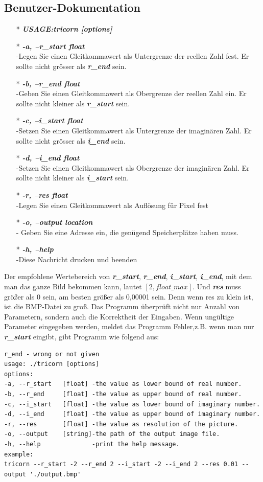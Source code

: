 \documentclass[course=erap]{aspdoc}
\begin{document}
\subsection{Benutzer-Dokumentation}
\begin{itemize}
\item[*]\textbf{\emph{USAGE:tricorn [options]}}
\item[*]\textbf{\emph{-a, --r\_start  float}}
\\-Legen Sie einen Gleitkommawert als Untergrenze der reellen Zahl fest. Er sollte nicht grösser als \emph{\textbf{r\_end}} sein.
\item[*]\textbf{\emph{-b, --r\_end float}}
\\-Geben Sie einen Gleitkommawert als Obergrenze der reellen Zahl ein. Er sollte nicht kleiner als \emph{\textbf{r\_start}} sein.
\item[*]\textbf{\emph{-c, --i\_start  float}}
\\-Setzen Sie einen Gleitkommawert als Untergrenze der imaginären Zahl. Er sollte nicht grösser als \emph{\textbf{i\_end}} sein.
\item[*]\textbf{\emph{-d, --i\_end  float}}
\\-Setzen Sie einen Gleitkommawert als Obergrenze der imaginären Zahl. Er sollte nicht kleiner als \emph{\textbf{i\_start}} sein.
\item[*]\textbf{\emph{-r, --res  float}}
\\-Legen Sie einen Gleitkommawert als Auflösung für Pixel fest
\item[*]\textbf{\emph{-o, --output  location}}
\\- Geben Sie eine Adresse ein, die genügend Speicherplätze haben muss.
\item[*]\textbf{\emph{-h, --help}}
\\-Diese Nachricht drucken und beenden
\end{itemize}
Der empfohlene Wertebereich von \textbf{\emph{r\_start}}, \textbf{\emph{r\_end}}, \textbf{\emph{i\_start}}, \textbf{\emph{i\_end}}, mit dem man das ganze Bild bekommen kann, lautet $[2,float\_max]$. Und \textbf{\emph{res}} muss größer als 0 sein, am besten größer als 0,00001 sein. Denn wenn res zu klein ist, ist die BMP-Datei zu groß. Das Programm überprüft nicht nur Anzahl von Parametern, sondern auch die Korrektheit der Eingaben. Wenn ungültige Parameter eingegeben werden, meldet das Programm Fehler,z.B. wenn man nur \emph{\textbf{r\_start}} eingibt, gibt Programm wie folgend aus:
\begin{lstlisting}
r_end - wrong or not given
usage: ./tricorn [options]
options:
-a, --r_start   [float] -the value as lower bound of real number.
-b, --r_end     [float] -the value as upper bound of real number.
-c, --i_start   [float] -the value as lower bound of imaginary number.
-d, --i_end     [float] -the value as upper bound of imaginary number.
-r, --res       [float] -the value as resolution of the picture.
-o, --output    [string]-the path of the output image file.
-h, --help              -print the help message.
example:
tricorn --r_start -2 --r_end 2 --i_start -2 --i_end 2 --res 0.01 --output './output.bmp'
\end{lstlisting}
\end{document}
